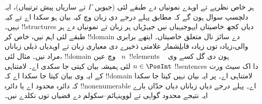 \documentclass[../../../include/open-logic-section]{subfiles}
\begin{document}
ہر خاص نظریے تے اوہدے
نمونیاں دے طبقے لئی
(جیویں $\Gamma$ تے
ساریاں پیش ترتیباں)،
ایہ دلچسپ سوال ہون
گے کہ مطابق پہلے درجے
دی زبان وچ کیہ بیان
ہو سکدا اے تے کیہ
نہیں۔ !!{structure}s
دیاں کجھ خاصیتاں
ایہوجیہیاں نیں جیہڑیاں
ہر زبان تے نمونیاں دے
ہر طبقے لئی اہم نیں،
خاص کر !!{domain}
دے سائز نال متعلق
خاصیتاں۔ ایتھے برابری والی،زیادہ توں زیادہ قابلِشمار
علامتی ذخیرے دی معیاری زبان تے اوہدیاں ذیلی زباناں مراد نیں۔ مثال لئی،
!!{domain} وچ عین
~$n$~!!{element}s
ہون دی گل کسے وی
~$n \in \PosInt$
لئی ہمیشہ بیان
کیتی جا سکدی اے۔
لامتناہی !!{sentence}s
دا اک سیٹ ورت کے
ایہ وی بیان کیتا
جا سکدا اے کہ
!!{domain} لامتناہی
اے۔ پر ایہ بیان
نہیں کیتا جا سکدا
کہ دائرہ محدود اے
یا دائرہ
!!{nonenumerable}
اے۔ پہلے درجے دیاں
زباناں دیاں حدّاں
بارے ایہ نتیجے
محدود گواہی تے
لووینہائم--سکولم
دے قضیاں توں نکلدے
نیں۔
\end{document}
